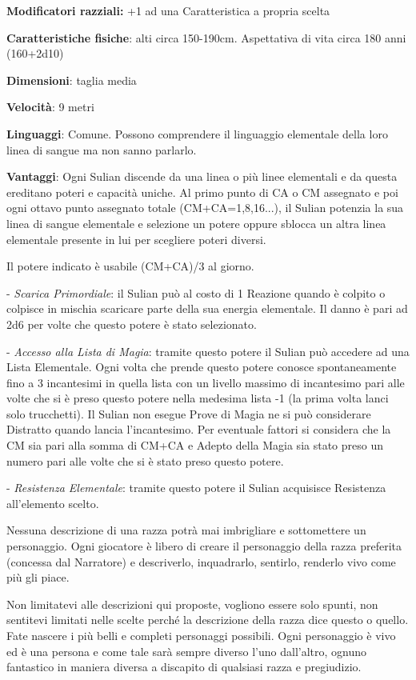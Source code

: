 \begin{multicols}{2}
\textbf{Modificatori razziali:} +1 ad una Caratteristica a propria scelta

\textbf{Caratteristiche fisiche}: alti circa 150-190cm. Aspettativa di vita circa 180 anni (160+2d10)

\textbf{Dimensioni}: taglia media

\textbf{Velocità}: 9 metri

\textbf{Linguaggi}: Comune. Possono comprendere il linguaggio elementale della loro linea di sangue ma non sanno parlarlo.

\textbf{Vantaggi}: Ogni Sulian discende da una linea o più linee elementali e da questa ereditano poteri e capacità uniche. Al primo punto di CA o CM assegnato e poi ogni ottavo punto assegnato totale (CM+CA=1,8,16...), il Sulian potenzia la sua linea di sangue elementale e selezione un potere oppure sblocca un altra linea elementale presente in lui per scegliere poteri diversi.

Il potere indicato è usabile (CM+CA)/3 al giorno.

- \emph{Scarica Primordiale}: il Sulian può al costo di 1 Reazione quando è colpito o colpisce in mischia scaricare parte della sua energia elementale. Il danno è pari ad 2d6 per volte che questo potere è stato selezionato.

- \emph{Accesso alla Lista di Magia}: tramite questo potere il Sulian può accedere ad una Lista Elementale. Ogni volta che prende questo potere conosce spontaneamente fino a 3 incantesimi in quella lista con un livello massimo di incantesimo pari alle volte che si è preso questo potere nella medesima lista -1 (la prima volta lanci solo trucchetti). 
Il Sulian non esegue Prove di Magia ne si può considerare Distratto quando lancia l'incantesimo. Per eventuale fattori si considera che la CM sia pari alla somma di CM+CA e Adepto della Magia sia stato preso un numero pari alle volte che si è stato preso questo potere.

- \emph{Resistenza Elementale}: tramite questo potere il Sulian acquisisce Resistenza all'elemento scelto.


\end{multicols}


\begin{changemargin}{0.3cm}{0.3cm}\begin{tcolorbox}[title = Nota sulle Razze]
Nessuna descrizione di una razza potrà mai imbrigliare e sottomettere un personaggio. Ogni giocatore è libero di creare il personaggio della razza preferita (concessa dal Narratore) e descriverlo, inquadrarlo, sentirlo, renderlo vivo come più gli piace. 

Non limitatevi alle descrizioni qui proposte, vogliono essere solo spunti, non sentitevi limitati nelle scelte perché la descrizione della razza dice questo o quello.
Fate nascere i più belli e completi personaggi possibili. Ogni personaggio è vivo ed è una persona e come tale sarà sempre diverso l'uno dall'altro, ognuno fantastico in maniera diversa a discapito di qualsiasi razza e pregiudizio.
\end{tcolorbox}\end{changemargin}

